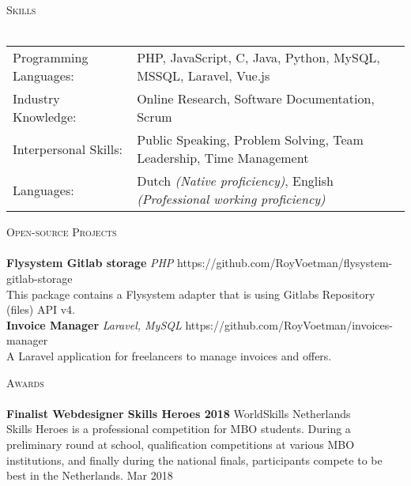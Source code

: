 \documentclass[a4paper]{article}
\newcommand{\lineunder} {
    \vspace*{-8pt} \\
    \hspace*{-18pt} \hrulefill \\
}
\newcommand{\header} [1] {
    {\hspace*{-18pt}\vspace*{6pt} \textsc{#1}}
    \vspace*{-6pt} \lineunder
}
\begin{document}
\header{Skills}
\begin{tabular}{ l l }
	Programming Languages: & PHP, JavaScript, C, Java, Python, MySQL, MSSQL, Laravel, Vue.js    \\
	Industry Knowledge:    & Online Research, Software Documentation, Scrum                     \\
	Interpersonal Skills:  & Public Speaking, Problem Solving, Team Leadership, Time Management \\
    Languages:             & Dutch \emph{(Native proficiency)}, English \emph{(Professional working proficiency)}\\
\end{tabular}
\vspace{2mm}

\newpage

\header{Open-source Projects}
{\textbf{Flysystem Gitlab storage}} {\sl PHP} \hfill https://github.com/RoyVoetman/flysystem-gitlab-storage\\
This package contains a Flysystem adapter that is using Gitlab\textquotesingle{}s Repository (files) API v4.\\
\vspace*{2mm}
{\textbf{Invoice Manager}} {\sl Laravel, MySQL} \hfill https://github.com/RoyVoetman/invoices-manager\\
A Laravel application for freelancers to manage invoices and offers.\\
\vspace*{2mm}

\header{Awards}
\textbf{Finalist Webdesigner Skills Heroes 2018} \hfill WorldSkills Netherlands\\
Skills Heroes is a professional competition for MBO students. During a preliminary round at school, qualification competitions at various MBO institutions, and finally during the national finals, participants compete to be best in the Netherlands. \hfill Mar 2018\\
\vspace*{2mm}

\ 
\end{document}
